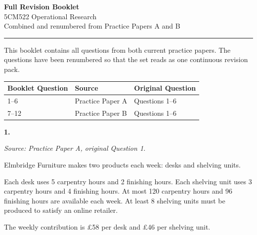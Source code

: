\documentclass[11pt,a4paper]{article}
\begin{document}
\begin{center}
{\Large\bfseries\color{bookletblue} Full Revision Booklet}\\[0.4em]
{\large 5CM522 Operational Research}\\[0.3em]
{\color{bookletgrey} Combined and renumbered from Practice Papers A and B}
\end{center}

\vspace{0.8em}
\hrule
\vspace{0.8em}

This booklet contains all questions from both current practice papers.
The questions have been renumbered so that the set reads as one continuous revision pack.

\begin{center}
\begin{tabular}{lll}
\toprule
Booklet Question & Source & Original Question \\
\midrule
1--6 & Practice Paper A & Questions 1--6 \\
7--12 & Practice Paper B & Questions 1--6 \\
\bottomrule
\end{tabular}
\end{center}

\newpage
\textbf{1.}

\textit{Source: Practice Paper A, original Question 1.}



Elmbridge Furniture makes two products each week: desks and shelving units.

Each desk uses 5 carpentry hours and 2 finishing hours.
Each shelving unit uses 3 carpentry hours and 4 finishing hours.
At most 120 carpentry hours and 96 finishing hours are available each week.
At least 8 shelving units must be produced to satisfy an online retailer.

The weekly contribution is \pounds58 per desk and \pounds46 per shelving unit.
\end{document}
